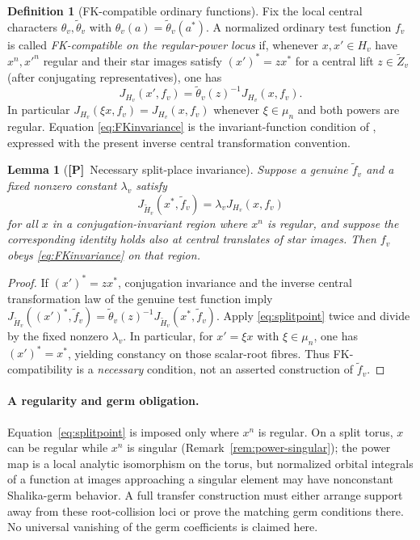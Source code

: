\documentclass[11pt]{article}
\newcommand{\Ptag}{\textnormal{\textbf{[P]}}}
\theoremstyle{plain}
\newtheorem{lemma}[theorem]{Lemma}
\theoremstyle{definition}
\newtheorem{definition}[theorem]{Definition}
\begin{document}
\begin{definition}[FK-compatible ordinary functions]\label{def:FKcompatible}
Fix the local central characters $\theta_v,\widetilde\theta_v$
with $\theta_v(a)=\widetilde\theta_v(a^*)$.  A normalized
ordinary test function $f_v$ is called \emph{FK-compatible on the
regular-power locus} if, whenever $x,x'\in H_v$ have $x^n,x'^n$
regular and their star images satisfy
$({x'})^*=z x^*$ for a central lift $z\in\widetilde Z_v$
(after conjugating representatives), one has
\begin{equation}\label{eq:FKinvariance}
 J_{H_v}(x',f_v)
   =\widetilde\theta_v(z)^{-1}J_{H_v}(x,f_v).
\end{equation}
In particular $J_{H_v}(\xi x,f_v)=J_{H_v}(x,f_v)$ whenever
$\xi\in\mu_n$ and both powers are regular.  Equation
\eqref{eq:FKinvariance} is the invariant-function condition of
\cite[\S6]{FK}, expressed with the present inverse central
transformation convention.
\end{definition}

\begin{lemma}[\Ptag\ Necessary split-place invariance]
\label{lem:FKnecessary}
Suppose a genuine $\widetilde f_v$ and a fixed nonzero constant
$\lambda_v$ satisfy
\begin{equation}\label{eq:splitpoint}
 J_{\widetilde H_v}(x^*,\widetilde f_v)
      =\lambda_v J_{H_v}(x,f_v)
\end{equation}
for all $x$ in a conjugation-invariant region where $x^n$ is regular,
and suppose the corresponding identity holds also at central
translates of star images.  Then $f_v$ obeys
\eqref{eq:FKinvariance} on that region.
\end{lemma}
\begin{proof}
If $({x'})^*=z x^*$, conjugation invariance and the inverse
central transformation law of the genuine test function imply
$J_{\widetilde H_v}(({x'})^*,\widetilde f_v)
=\widetilde\theta_v(z)^{-1}
J_{\widetilde H_v}(x^*,\widetilde f_v)$.
Apply \eqref{eq:splitpoint} twice and divide by the fixed
nonzero $\lambda_v$.  In particular, for $x'=\xi x$ with
$\xi\in\mu_n$, one has $({x'})^*=x^*$, yielding constancy
on those scalar-root fibres.  Thus FK-compatibility is a
\emph{necessary} condition, not an asserted construction of
$\widetilde f_v$.
\end{proof}

\paragraph{A regularity and germ obligation.}
Equation~\eqref{eq:splitpoint} is imposed only where $x^n$ is
regular.  On a split torus, $x$ can be regular while $x^n$ is
singular (Remark~\ref{rem:power-singular}); the power map is a
local analytic isomorphism on the torus, but normalized orbital
integrals of a function at images approaching a singular element
may have nonconstant Shalika-germ behavior.  A full transfer
construction must either arrange support away from these
root-collision loci or prove the matching germ conditions there.
No universal vanishing of the germ coefficients is claimed here.
\end{document}
